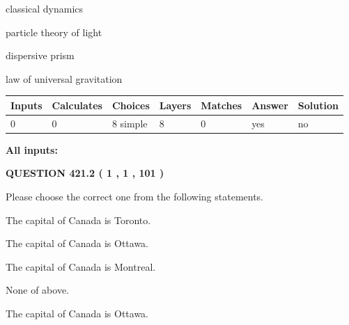 \documentclass[12pt]{article}
\begin{document}
 
classical dynamics
 
 
particle theory of light
 
 
dispersive prism
 
 
law of universal gravitation
 
 
\noindent{}
 
 
   
   
   
   
\noindent\begin{tabular}{|l|l|l|l|l|l|l|}
 \hline
Inputs & Calculates & Choices & Layers & Matches & Answer & Solution \\ \hline
 0  & 
 0  & 
 8
  simple  
  & 
 8  & 
 0  & 
  yes & 
  no 
  \\ \hline
 \end{tabular}
   
   
   
   
\noindent{}
   
   
   
   
\noindent\vspace{0.1in}\hspace{-0.08in} {\textbf{\Large{All inputs: }}}
   
   
  
\vspace{0.2in}
  
{\textbf{\Large{QUESTION
421.2 
 ( 1 , 1 , 101 )
}}}
  
  
Please choose the correct one from the following statements.
 
 
The capital of Canada is Toronto.
 
 
The capital of Canada is Ottawa.
 
 
The capital of Canada is Montreal.
 
 
 None of above.
 
 
\noindent{}
 
 
The capital of Canada is Ottawa.
 
 
\noindent{}
 
\end{document}
